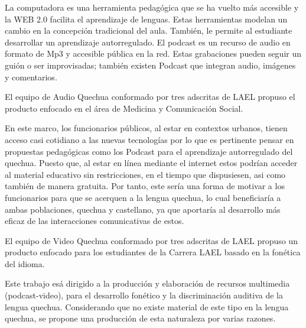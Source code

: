 La computadora es una herramienta pedag\'{o}gica que se ha vuelto m\'{a}s accesible y la WEB 2.0 facilita el aprendizaje de lenguas.
Estas herramientas modelan un cambio en la concepci\'{o}n tradicional del aula. Tambi\'{e}n, le permite al estudiante desarrollar
un aprendizaje autorregulado. El podcast es un recurso de audio en formato de Mp3 y accesible p\'{u}blica en la red. Estas grabaciones
pueden seguir un gui\'{o}n o ser improvisadas; tambi\'{e}n existen Podcast que integran audio, im\'{a}genes y comentarios.\cite{AFSTVV2015}

El equipo de Audio Quechua conformado por tres adscritas de LAEL propuso el producto enfocado en el \'{a}rea de Medicina y
Comunicaci\'{o}n Social. 

En este marco, los funcionarios p\'{u}blicos, al estar en contextos urbanos, tienen acceso casi cotidiano a las nuevas tecnolog\'{i}as
por lo que es pertinente pensar en propuestas pedag\'{o}gicas como los Podcast para el aprendizaje autorregulado del quechua. Puesto que,
al estar en l\'{i}nea mediante el internet estos podr\'{i}an acceder al material educativo sin restricciones, en el tiempo que dispusiesen,
asi como tambi\'{e}n de manera gratuita. Por tanto, este ser\'{i}a una forma de motivar a los funcionarios para que se acerquen a la lengua
quechua, lo cual beneficiar\'{i}a a ambas poblaciones, quechua y castellano, ya que aportar\'{i}a al desarrollo m\'{a}s eficaz de las interacciones comunicativas de estos.\cite{CCZ2015}

El equipo de Video Quechua conformado por tres adscritas de LAEL propuso un producto enfocado para los estudiantes de la Carrera
LAEL basado en la fon\'{e}tica del idioma.

Este trabajo es\'{a} dirigido a la producci\'{o}n y elaboraci\'{o}n de recursos multimedia (podcast-video), para el desarrollo fon\'{e}tico y la discriminaci\'{o}n auditiva de la lengua quechua. Considerando que no existe material de este tipo en la lengua quechua, se propone una producci\'{o}n de esta naturaleza por varias razones.\cite{CGL2015}

